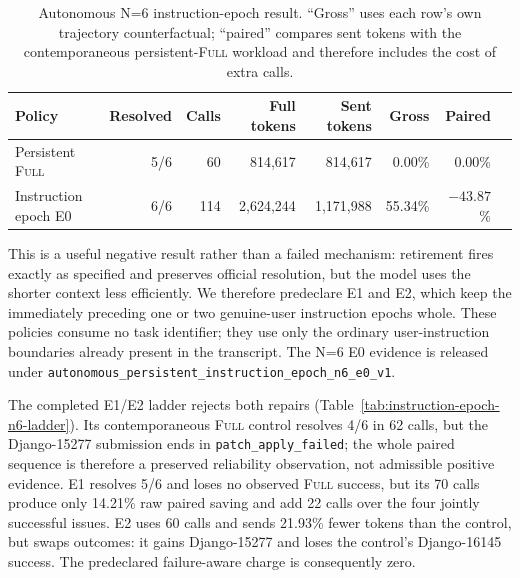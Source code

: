 \documentclass[11pt]{article}
\begin{document}
\begin{table}[H]
\centering
\small
\caption{Autonomous N=6 instruction-epoch result.  ``Gross'' uses each row's
own trajectory counterfactual; ``paired'' compares sent tokens with the
contemporaneous persistent-\textsc{Full} workload and therefore includes the
cost of extra calls.}
\label{tab:instruction-epoch-n6-e0}
\begin{tabular}{lrrrrrrr}
\toprule
Policy & Resolved & Calls & Full tokens & Sent tokens & Gross & Paired \\
\midrule
Persistent \textsc{Full} & 5/6 & 60 & 814,617 & 814,617 & 0.00\% & 0.00\% \\
Instruction epoch E0 & 6/6 & 114 & 2,624,244 & 1,171,988 & 55.34\% & $-43.87$\% \\
\bottomrule
\end{tabular}
\end{table}

This is a useful negative result rather than a failed mechanism: retirement
fires exactly as specified and preserves official resolution, but the model
uses the shorter context less efficiently.  We therefore predeclare E1 and E2,
which keep the immediately preceding one or two genuine-user instruction
epochs whole.  These policies consume no task identifier; they use only the
ordinary user-instruction boundaries already present in the transcript.  The
N=6 E0 evidence is released under
\texttt{autonomous\_persistent\_instruction\_epoch\_n6\_e0\_v1}.

The completed E1/E2 ladder rejects both repairs
(Table~\ref{tab:instruction-epoch-n6-ladder}).  Its contemporaneous
\textsc{Full} control resolves 4/6 in 62 calls, but the Django-15277 submission
ends in \texttt{patch\_apply\_failed}; the whole paired sequence is therefore a
preserved reliability observation, not admissible positive evidence.  E1
resolves 5/6 and loses no observed \textsc{Full} success, but its 70 calls
produce only 14.21\% raw paired saving and add 22 calls over the four jointly
successful issues.  E2 uses 60 calls and sends 21.93\% fewer tokens than the
control, but swaps outcomes: it gains Django-15277 and loses the control's
Django-16145 success.  The predeclared failure-aware charge is consequently
zero.
\end{document}

